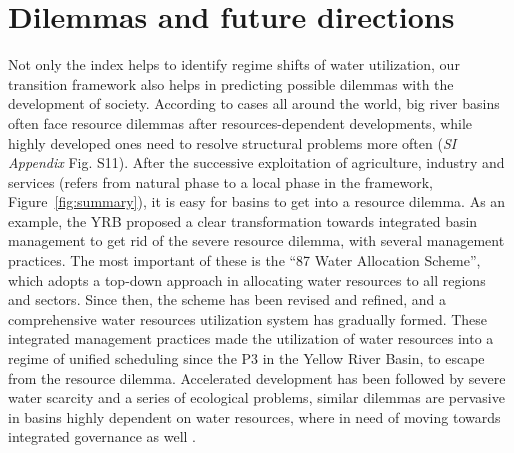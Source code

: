 \documentclass[9pt, twocolumn, twoside, lineno]{pnas-new}
\begin{document}
\section*{Dilemmas and future directions}
Not only the index helps to identify regime shifts of water utilization, our transition framework also helps in predicting possible dilemmas with the development of society.
According to cases all around the world, big river basins often face resource dilemmas after resources-dependent developments, while highly developed ones need to resolve structural problems more often (\textit{SI Appendix} Fig. S11).
After the successive exploitation of agriculture, industry and services (refers from natural phase to a local phase in the framework, Figure~\ref{fig:summary}), it is easy for basins to get into a resource dilemma.
As an example, the YRB proposed a clear transformation towards integrated basin management to get rid of the severe resource dilemma, with several management practices. 
The most important of these is the “87 Water Allocation Scheme”, which adopts a top-down approach in allocating water resources to all regions and sectors. 
Since then, the scheme has been revised and refined, and a comprehensive water resources utilization system has gradually formed. 
These integrated management practices made the utilization of water resources into a regime of unified scheduling since the P3 in the Yellow River Basin, to escape from the resource dilemma. 
Accelerated development has been followed by severe water scarcity and a series of ecological problems, similar dilemmas are pervasive in basins highly dependent on water resources, where in need of moving towards integrated governance as well 
\cite{bestAnthropogenicStressesWorld2019,cummingResilienceBigRiver2011,unep-dhiTransboundaryRiverBasins2016}.
\end{document}
